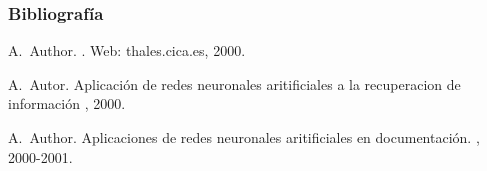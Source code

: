 \documentclass{beamer}
\begin{document}
\begin{frame}[allowframebreaks]
\frametitle<presentation>{Bibliografía}
    
\begin{thebibliography}{10}  
\beamertemplatebookbibitems
{}
A.~Author.
.
\newblock Web: thales.cica.es, 2000.
 
\beamertemplatearticlebibitems

A.~Autor.
\newblock Aplicación de redes neuronales aritificiales a la recuperacion de información
, 2000.

\beamertemplatearticlebibitems
{}
A.~Author.
\newblock Aplicaciones de redes neuronales aritificiales en documentación.
, 2000-2001.

\end{thebibliography}
\end{frame}
\end{document}
